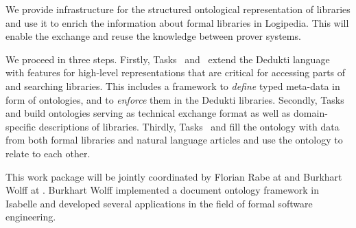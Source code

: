 \begin{workpackage}[id=structuring,wphases=0-48,type=RTD,
  short=Structured Theories and Metadata,%
  title=Structured Theories and Metadata,
  lead=Fau,
  BolRM=6,
  FauRM=48,
  SacRM=50,
  TouRM=12,
  InrRM=14]
  


\begin{wpobjectives}
We provide infrastructure for the structured ontological representation of libraries and use it to enrich the information about formal libraries in Logipedia.
This will enable the exchange and reuse the knowledge between prover systems.
\end{wpobjectives}


\begin{wpdescription}
We proceed in three steps.
Firstly, Tasks~ and~ extend the Dedukti language with features for high-level representations that are critical for accessing parts of and searching libraries.
This includes a framework to \emph{define} typed meta-data in form of ontologies, and to \emph{enforce} them in 
the Dedukti libraries.
Secondly, Tasks~ and  build ontologies serving as technical exchange format as well as domain-specific descriptions of libraries.
Thirdly, Tasks~ and  fill the ontology with data from both formal libraries and natural language articles and use the ontology to relate to each other.

This work package will be jointly coordinated by Florian Rabe at  and Burkhart Wolff at .
Burkhart Wolff implemented a document ontology framework in Isabelle and developed several applications
in the field of formal software engineering.
\cite{brucker.ea:ontologies-certification:2019,brucker.ea:isabelle-ontologies:2018,brucker.ea:ontologies-certification:2019} 
\end{wpdescription}


\end{workpackage}
